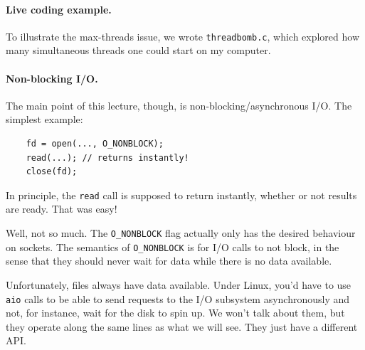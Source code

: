 \documentclass[11pt]{article}
\begin{document}
\paragraph{Live coding example.} To illustrate the max-threads
issue, we wrote {\tt threadbomb.c}, which explored how many simultaneous threads
one could start on my computer.

\paragraph{Non-blocking I/O.} The main point of this lecture, though,
is non-blocking/asynchronous I/O. The simplest example:

\begin{lstlisting}
    fd = open(..., O_NONBLOCK);
    read(...); // returns instantly!
    close(fd);
\end{lstlisting}

In principle, the {\tt read} call is supposed to return instantly,
whether or not results are ready. That was easy!

Well, not so much. The {\tt O\_NONBLOCK} flag actually only has the
desired behaviour on sockets. The semantics of {\tt O\_NONBLOCK} is
for I/O calls to not block, in the sense that they should never wait
for data while there is no data available.

Unfortunately, files always have data available. Under Linux, you'd have
to use {\tt aio} calls to be able to send requests to the I/O subsystem
asynchronously and not, for instance, wait for the disk to spin up.
We won't talk about them, but they operate along the same lines as what
we will see. They just have a different API.
\end{document}
